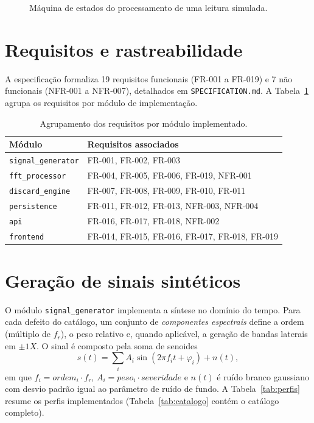 \begin{figure}[htbp]
\centering

\caption{Máquina de estados do processamento de uma leitura simulada.}
\label{fig:estados}
\par\vspace{2pt}{\footnotesize Fonte: elaboração própria, conforme arquitetura do projeto.}
\end{figure}

\section{Requisitos e rastreabilidade}

A especificação formaliza 19 requisitos funcionais (FR-001 a FR-019) e 7 não
funcionais (NFR-001 a NFR-007), detalhados em \texttt{SPECIFICATION.md}. A
Tabela~\ref{tab:requisitos} agrupa os requisitos por módulo de implementação.

\begin{table}[htbp]
\centering
\caption{Agrupamento dos requisitos por módulo implementado.}
\label{tab:requisitos}
\begin{tabular}{@{}p{4.4cm}p{8.6cm}@{}}
\toprule
\textbf{Módulo} & \textbf{Requisitos associados} \\
\midrule
\texttt{signal\_generator} & FR-001, FR-002, FR-003 \\
\texttt{fft\_processor} & FR-004, FR-005, FR-006, FR-019, NFR-001 \\
\texttt{discard\_engine} & FR-007, FR-008, FR-009, FR-010, FR-011 \\
\texttt{persistence} & FR-011, FR-012, FR-013, NFR-003, NFR-004 \\
\texttt{api} & FR-016, FR-017, FR-018, NFR-002 \\
\texttt{frontend} & FR-014, FR-015, FR-016, FR-017, FR-018, FR-019 \\
\bottomrule
\end{tabular}
\par\vspace{2pt}{\footnotesize Fonte: SPECIFICATION.md do projeto.}
\end{table}

\section{Geração de sinais sintéticos}

O módulo \texttt{signal\_generator} implementa a síntese no domínio do tempo. Para cada
defeito do catálogo, um conjunto de \emph{componentes espectrais} define a
ordem (múltiplo de \(f_r\)), o peso relativo e, quando aplicável, a geração de
bandas laterais em \(\pm 1X\). O sinal é composto pela soma de senoides
\begin{equation}
\label{eq:sintese}
  s(t) = \sum_i A_i \sin(2\pi f_i t + \varphi_i) + n(t),
\end{equation}
em que \(f_i = ordem_i \cdot f_r\), \(A_i = peso_i \cdot severidade\) e
\(n(t)\) é ruído branco gaussiano com desvio padrão igual ao parâmetro de ruído
de fundo. A Tabela~\ref{tab:perfis} resume os perfis implementados
(Tabela~\ref{tab:catalogo} contém o catálogo completo).

